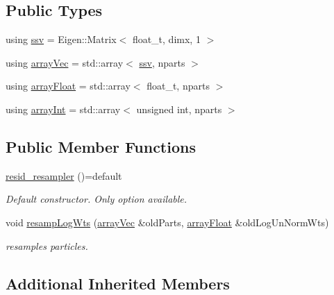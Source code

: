 \subsection*{Public Types}
\begin{DoxyCompactItemize}
\item 
using \hyperlink{classresid__resampler_a500f44f0072a4d54b03762c946c38981}{ssv} = Eigen\+::\+Matrix$<$ float\+\_\+t, dimx, 1 $>$
\item 
using \hyperlink{classresid__resampler_a33ba5996cd3099fb81d9932bf5f460c0}{array\+Vec} = std\+::array$<$ \hyperlink{classrbase_ae20e0b8df15aa109252f57ecbf1f20f8}{ssv}, nparts $>$
\item 
using \hyperlink{classresid__resampler_ab95ecc6d5a33f1cbc9089a6b818df405}{array\+Float} = std\+::array$<$ float\+\_\+t, nparts $>$
\item 
using \hyperlink{classresid__resampler_a2ca1138b2d0fcad22c3720c83e56fc47}{array\+Int} = std\+::array$<$ unsigned int, nparts $>$
\end{DoxyCompactItemize}
\subsection*{Public Member Functions}
\begin{DoxyCompactItemize}
\item 
\mbox{\label{classresid__resampler_a7b3ebcc490d296b4ad9747c369b92f67}} 
\hyperlink{classresid__resampler_a7b3ebcc490d296b4ad9747c369b92f67}{resid\+\_\+resampler} ()=default
\begin{DoxyCompactList}\small\item\em Default constructor. Only option available. \end{DoxyCompactList}\item 
void \hyperlink{classresid__resampler_ae6957cd1e080ac4313e6b0bc5ae9aa96}{resamp\+Log\+Wts} (\hyperlink{classrbase_aa12fc826befa6ba0647b5f59ebc396ee}{array\+Vec} \&old\+Parts, \hyperlink{classrbase_a6f76bef853e508cb5b6f546d231b06f5}{array\+Float} \&old\+Log\+Un\+Norm\+Wts)
\begin{DoxyCompactList}\small\item\em resamples particles. \end{DoxyCompactList}\end{DoxyCompactItemize}
\subsection*{Additional Inherited Members}


